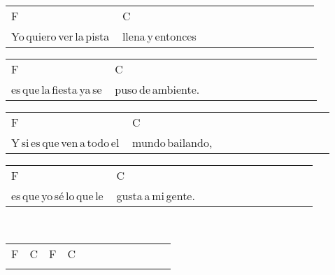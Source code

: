 \begin{multicols}{2}
\noindent
\begin{minipage}{\columnwidth}
\noindent
\noindent
\begin{tabular}{llllllllllll}
F&C\\
Yo\,quiero\,ver\,la\,pista\,&llena\,y\,entonces
\end{tabular}

\noindent
\begin{tabular}{llllllllllll}
F&C\\
es\,que\,la\,fiesta\,ya\,se\,&puso\,de\,ambiente.
\end{tabular}

\noindent
\begin{tabular}{llllllllllll}
F&C\\
Y\,si\,es\,que\,ven\,a\,todo\,el\,&mundo\,bailando,
\end{tabular}

\noindent
\begin{tabular}{llllllllllll}
F&C\\
es\,que\,yo\,sé\,lo\,que\,le\,&gusta\,a\,mi\,gente.
\end{tabular}
\end{minipage}\\

\noindent
\begin{minipage}{\columnwidth}
\noindent
\noindent
\begin{tabular}{llllllllllll}
F&C&F&C\\
\quad\quad\quad\quad&\quad\quad\quad\quad&\quad\quad\quad\quad&
\end{tabular}
\end{minipage}\\

\end{multicols}